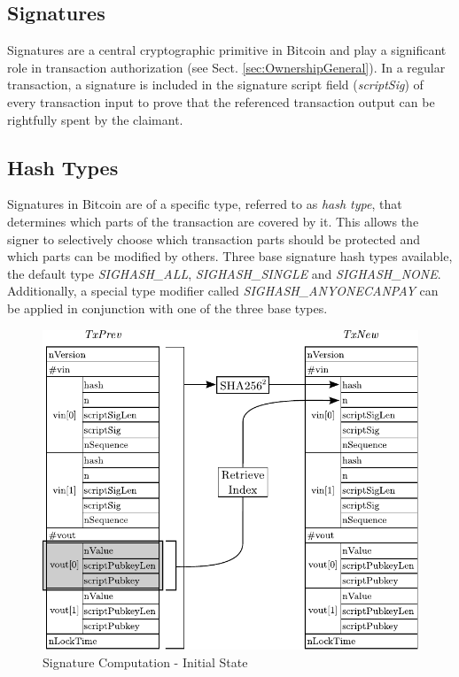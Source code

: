 \clearpage
\subsection{Signatures} \label{sec:Signatures}
Signatures are a central cryptographic primitive in Bitcoin and play a significant role in transaction authorization (see Sect. \ref{sec:OwnershipGeneral}). In a regular transaction, a signature is included in the signature script field (\textit{scriptSig}) of every transaction input to prove that the referenced transaction output can be rightfully spent by the claimant.

\subsection*{Hash Types}
Signatures in Bitcoin are of a specific type, referred to as \emph{hash type}, that determines which parts of the transaction are covered by it. This allows the signer to selectively choose which transaction parts should be protected and which parts can be modified by others. Three base signature hash types available, the default type \emph{SIGHASH\_ALL}, \emph{SIGHASH\_SINGLE} and \emph{SIGHASH\_NONE}. Additionally, a special type modifier called \emph{SIGHASH\_ANYONECANPAY} can be applied in conjunction with one of the three base types.

\vspace{-5pt}
\begin{figure}[ht!]
 \centering
 \includegraphics[scale=0.975]{Images/Transaction2In2Out.pdf}
 \caption{Signature Computation - Initial State} \label{fig:Signature-InitState}
\end{figure}
\vspace{-5pt}

